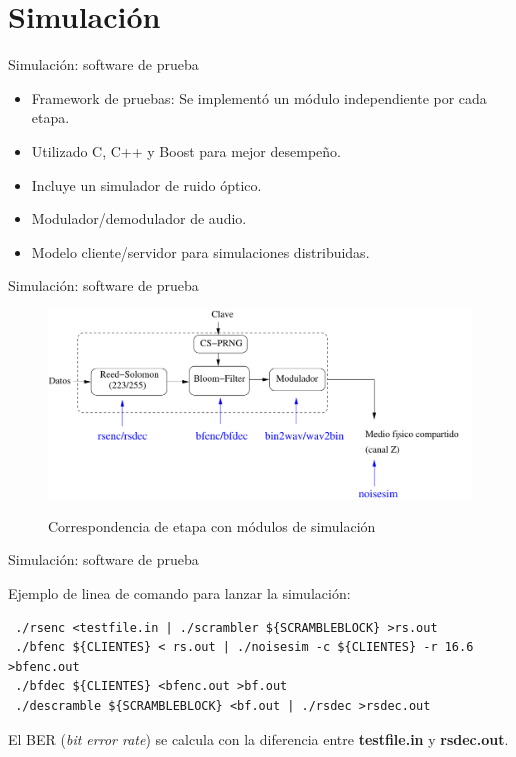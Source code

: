 \documentclass[aspectratio=169]{beamer}
\begin{document}
\section{Simulación}

\begin{frame}{Simulación: software de prueba}


  \begin{itemize}
  \item Framework de pruebas: Se implementó un módulo independiente por cada etapa.
  \item Utilizado C, C++ y Boost para mejor desempeño.
  \item Incluye un simulador de ruido óptico.
  \item Modulador/demodulador de audio.
  \item Modelo cliente/servidor para simulaciones distribuidas.
  \end{itemize}


\end{frame}

\begin{frame}{Simulación: software de prueba}

  \begin{figure}[t]
    \includegraphics[width=0.90 \textwidth]{../graphs/Soft-stack-sim} 
    
    Correspondencia de etapa con módulos de simulación
\end{figure}


\end{frame}

\begin{frame}[fragile]{Simulación: software de prueba}

Ejemplo de linea de comando para lanzar la simulación:

\small
\begin{verbatim}
 ./rsenc <testfile.in | ./scrambler ${SCRAMBLEBLOCK} >rs.out
 ./bfenc ${CLIENTES} < rs.out | ./noisesim -c ${CLIENTES} -r 16.6 >bfenc.out
 ./bfdec ${CLIENTES} <bfenc.out >bf.out
 ./descramble ${SCRAMBLEBLOCK} <bf.out | ./rsdec >rsdec.out
\end{verbatim}
\normalsize

El BER (\textit{bit error rate}) se calcula con la diferencia entre \textbf{testfile.in} y \textbf{rsdec.out}.
\end{frame}
\end{document}
